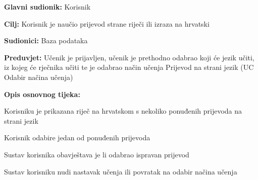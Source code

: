 					\noindent {}
					\begin{packed_item}

						\item \textbf{Glavni sudionik: } Korisnik
						\item \textbf{Cilj: } Korisnik je naučio prijevod strane riječi ili izraza na hrvatski
						\item \textbf{Sudionici: } Baza podataka
						\item \textbf{Preduvjet: } Učenik je prijavljen, učenik je prethodno odabrao koji će jezik učiti, iz kojeg će rječnika učiti te je odabrao način učenja Prijevod na strani jezik (UC Odabir načina učenja)
						\item  \textbf{Opis osnovnog tijeka:} 
						
						\item[] \begin{packed_enum}
							
							\item Korisniku je prikazana riječ na hrvatskom s nekoliko ponuđenih prijevoda na strani jezik
							\item Korisnik odabire jedan od ponuđenih prijevoda
							\item Sustav korisnika obavještava je li odabrao ispravan prijevod
							\item Sustav korisniku nudi nastavak učenja ili povratak na odabir načina učenja

						\end{packed_enum}

					\end{packed_item}


